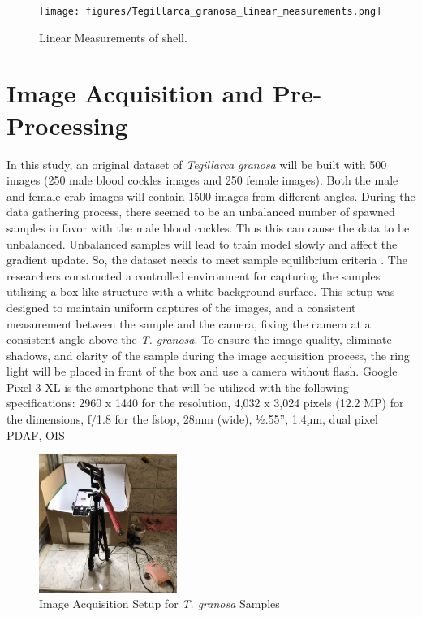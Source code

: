 \begin{figure}[!htbp]
	\centering
	\texttt{[image: figures/Tegillarca\_granosa\_linear\_measurements.png]}
	\caption{Linear Measurements of  \Tegillarcagranosa shell.}
	\label{fig:linear_measurements}
\end{figure}

\section{Image Acquisition and Pre-Processing}
\label{sec:imageprocess}
In this study, an original dataset of \textit{Tegillarca granosa} will be built with 500 images (250 male blood cockles images and 250 female images). Both the male and female crab images will contain 1500 images from different angles. During the data gathering process, there seemed to be an unbalanced number of spawned samples in favor with the male blood cockles. Thus this can cause the data to be unbalanced. Unbalanced samples will lead to train model slowly and affect the gradient update. So, the dataset needs to meet sample equilibrium criteria \cite{cui2020}. The researchers constructed a controlled environment for capturing the samples utilizing a box-like structure with a white background surface. This setup was designed to maintain uniform captures of the images, and a consistent measurement between the sample and the camera, fixing the camera at a consistent angle above the \textit{T. granosa}. To ensure the image quality, eliminate shadows, and clarity of the sample during the image acquisition process, the ring light will be placed in front of the box and use a camera without flash. Google Pixel 3 XL is the smartphone that will be utilized with the following specifications: 2960 x 1440 for the resolution, 4,032 x 3,024 pixels (12.2 MP) for the dimensions, f/1.8 for the fstop, 28mm (wide), ½.55”, 1.4µm, dual pixel PDAF, OIS \cite{concepcion2023}

\begin{figure}[!htbp]
	\centering
	\includegraphics[width=0.4\textwidth]{figures/setup.jpg}
	\caption{Image Acquisition Setup for \textit{T. granosa} Samples}
	\label{fig: setup}
\end{figure}



